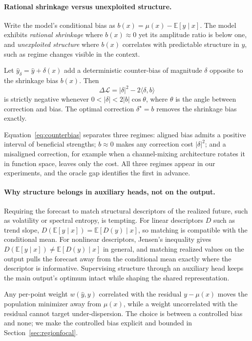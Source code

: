 \paragraph{Rational shrinkage versus unexploited structure.}

Write the model's conditional bias as $b(x) = \mu(x) - \mathbb{E}[\hat{y} \mid x]$. The model exhibits \emph{rational shrinkage} where $b(x) \approx 0$ yet its amplitude ratio is below one, and \emph{unexploited structure} where $b(x)$ correlates with predictable structure in $y$, such as regime changes visible in the context.

\begin{proposition}
\label{prop:interval}
Let $\hat{y}_\delta = \hat{y} + \delta(x)$ add a deterministic counter-bias of magnitude $\delta$ opposite to the shrinkage bias $b(x)$. Then
\begin{equation}
    \Delta \mathcal{L} = |\delta|^2 - 2\langle \delta, b \rangle
    \label{eq:counterbias}
\end{equation}
is strictly negative whenever $0 < |\delta| < 2|b| \cos\theta$, where $\theta$ is the angle between correction and bias. The optimal correction $\delta^\star = b$ removes the shrinkage bias exactly.
\end{proposition}

Equation~\eqref{eq:counterbias} separates three regimes: aligned bias admits a positive interval of beneficial strengths; $b \approx 0$ makes any correction cost $|\delta|^2$; and a misaligned correction, for example when a channel-mixing architecture rotates it in function space, leaves only the cost. All three regimes appear in our experiments, and the oracle gap identifies the first in advance.

\paragraph{Why structure belongs in auxiliary heads, not on the output.}

Requiring the forecast to match structural descriptors of the realized future, such as volatility or spectral entropy, is tempting. For linear descriptors $D$ such as trend slope, $D(\mathbb{E}[y \mid x]) = \mathbb{E}[D(y) \mid x]$, so matching is compatible with the conditional mean. For nonlinear descriptors, Jensen's inequality gives $D(\mathbb{E}[y \mid x]) \neq \mathbb{E}[D(y) \mid x]$ in general, and matching realized values on the output pulls the forecast away from the conditional mean exactly where the descriptor is informative. Supervising structure through an auxiliary head keeps the main output's optimum intact while shaping the shared representation.
\begin{remark}
\label{rem:impossible}
Any per-point weight $w(\hat{y}, y)$ correlated with the residual $y - \mu(x)$ moves the population minimizer away from $\mu(x)$, while a weight uncorrelated with the residual cannot target under-dispersion. The choice is between a controlled bias and none; we make the controlled bias explicit and bounded in Section~\ref{sec:regionfocal}.
\end{remark}

